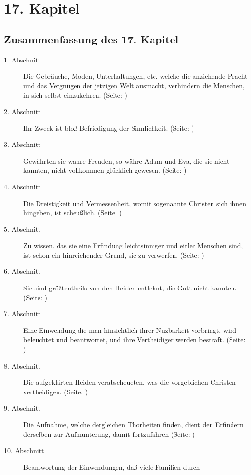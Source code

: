 
\chapter{17. Kapitel} \label{kap17}
\section{Zusammenfassung des 17. Kapitel}
\small
\begin{description}
\item[1. Abschnitt] Die Gebräuche, Moden, Unterhaltungen, etc. welche die
anziehende Pracht und das Vergnügen der jetzigen Welt ausmacht, verhindern die
Menschen, in sich selbst einzukehren. (Seite: \pageref{kap17_ab1})
\item[2. Abschnitt] Ihr Zweck ist bloß Befriedigung der Sinnlichkeit. (Seite:
\pageref{kap17_ab2})
\item[3. Abschnitt] Gewährten sie wahre Freuden, so währe Adam und Eva, die sie
nicht kannten, nicht vollkommen glücklich gewesen. (Seite: \pageref{kap17_ab3})
\item[4. Abschnitt] Die Dreistigkeit und Vermessenheit, womit sogenannte
Christen sich ihnen hingeben, ist scheußlich. (Seite: \pageref{kap17_ab4})
\item[5. Abschnitt] Zu wissen, das sie eine Erfindung leichtsinniger und eitler
Menschen sind, ist schon ein hinreichender Grund, sie zu verwerfen. (Seite:
\pageref{kap17_ab5})
\item[6. Abschnitt] Sie sind größtentheils von den Heiden entlehnt, die Gott
nicht kannten. (Seite: \pageref{kap17_ab6})
\item[7. Abschnitt] Eine Einwendung die man hinsichtlich ihrer Nuzbarkeit
vorbringt, wird beleuchtet und beantwortet, und ihre Vertheidiger werden
bestraft. (Seite: \pageref{kap17_ab7})
\item[8. Abschnitt] Die aufgeklärten Heiden verabscheueten, was die vorgeblichen
Christen vertheidigen. (Seite: \pageref{kap17_ab8})
\item[9. Abschnitt] Die Aufnahme, welche dergleichen Thorheiten finden, dient
den Erfindern derselben zur Aufmunterung, damit fortzufahren (Seite:
\pageref{kap17_ab9})
\item[10. Abschnitt] Beantwortung der Einwendungen, daß viele Familien durch

\end{description}
